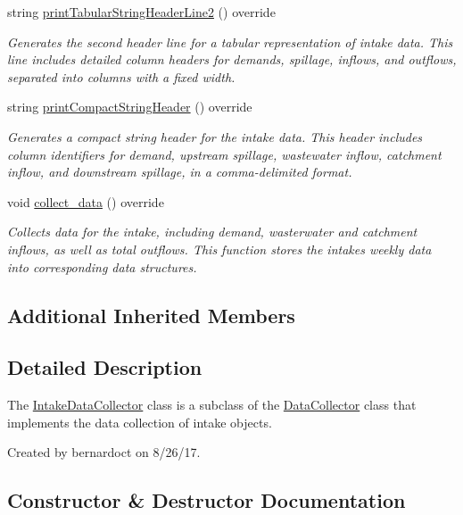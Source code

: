 \begin{DoxyCompactItemize}
string \mbox{\hyperlink{classIntakeDataCollector_a2855eb8eed71649309bd4d9336f258c0}{print\+Tabular\+String\+Header\+Line2}} () override
\begin{DoxyCompactList}\small\item\em Generates the second header line for a tabular representation of intake data. This line includes detailed column headers for demands, spillage, inflows, and outflows, separated into columns with a fixed width. \end{DoxyCompactList}\item 
string \mbox{\hyperlink{classIntakeDataCollector_a42d56dd08e57a7e6e48812a2ab522439}{print\+Compact\+String\+Header}} () override
\begin{DoxyCompactList}\small\item\em Generates a compact string header for the intake data. This header includes column identifiers for demand, upstream spillage, wastewater inflow, catchment inflow, and downstream spillage, in a comma-\/delimited format. \end{DoxyCompactList}\item 
void \mbox{\hyperlink{classIntakeDataCollector_aed1610e5419465b35041b05b9f60c212}{collect\+\_\+data}} () override
\begin{DoxyCompactList}\small\item\em Collects data for the intake, including demand, wasterwater and catchment inflows, as well as total outflows. This function stores the intake\textquotesingle{}s weekly data into corresponding data structures. \end{DoxyCompactList}\end{DoxyCompactItemize}
\subsection*{Additional Inherited Members}


\subsection{Detailed Description}
The {\ttfamily \mbox{\hyperlink{classIntakeDataCollector}{Intake\+Data\+Collector}}} class is a subclass of the {\ttfamily \mbox{\hyperlink{classDataCollector}{Data\+Collector}}} class that implements the data collection of intake objects. 

Created by bernardoct on 8/26/17. 

\subsection{Constructor \& Destructor Documentation}
\mbox{\label{classIntakeDataCollector_a2ab4a81bec74a370c60c78609627e807}} 
